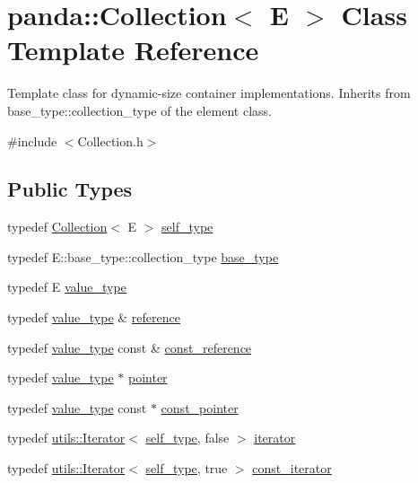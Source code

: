 \hypertarget{classpanda_1_1Collection}{
\section{panda::Collection$<$ E $>$ Class Template Reference}
\label{classpanda_1_1Collection}
}


Template class for dynamic-\/size container implementations. Inherits from base\_\-type::collection\_\-type of the element class.  


{\ttfamily \#include $<$Collection.h$>$}\subsection*{Public Types}
\begin{DoxyCompactItemize}
\item 
typedef \hyperlink{classpanda_1_1Collection}{Collection}$<$ E $>$ \hyperlink{classpanda_1_1Collection_a0e17bbfa4853912ae5e3d1fdff2299e2}{self\_\-type}
\item 
typedef E::base\_\-type::collection\_\-type \hyperlink{classpanda_1_1Collection_a21feac1cf85f41783beabc65abd54611}{base\_\-type}
\item 
typedef E \hyperlink{classpanda_1_1Collection_a9df859281619e6213192b6f7af902d76}{value\_\-type}
\item 
typedef \hyperlink{classpanda_1_1Collection_a9df859281619e6213192b6f7af902d76}{value\_\-type} \& \hyperlink{classpanda_1_1Collection_a908a535fcc02ad985ac9eb974f02546f}{reference}
\item 
typedef \hyperlink{classpanda_1_1Collection_a9df859281619e6213192b6f7af902d76}{value\_\-type} const \& \hyperlink{classpanda_1_1Collection_a0b74becc406f47de15442c670ae70caf}{const\_\-reference}
\item 
typedef \hyperlink{classpanda_1_1Collection_a9df859281619e6213192b6f7af902d76}{value\_\-type} $\ast$ \hyperlink{classpanda_1_1Collection_ab3c725349a6a4adb0c0d9258d86d60fe}{pointer}
\item 
typedef \hyperlink{classpanda_1_1Collection_a9df859281619e6213192b6f7af902d76}{value\_\-type} const $\ast$ \hyperlink{classpanda_1_1Collection_ab1e92c77768c1794f4493560b91612e0}{const\_\-pointer}
\item 
typedef \hyperlink{classpanda_1_1utils_1_1Iterator}{utils::Iterator}$<$ \hyperlink{classpanda_1_1Collection}{self\_\-type}, false $>$ \hyperlink{classpanda_1_1Collection_af5db8970e7a032f09aa723c91ebf2e84}{iterator}
\item 
typedef \hyperlink{classpanda_1_1utils_1_1Iterator}{utils::Iterator}$<$ \hyperlink{classpanda_1_1Collection}{self\_\-type}, true $>$ \hyperlink{classpanda_1_1Collection_acc749ab7812ec93b3cdf4096e4320e17}{const\_\-iterator}
\end{DoxyCompactItemize}

